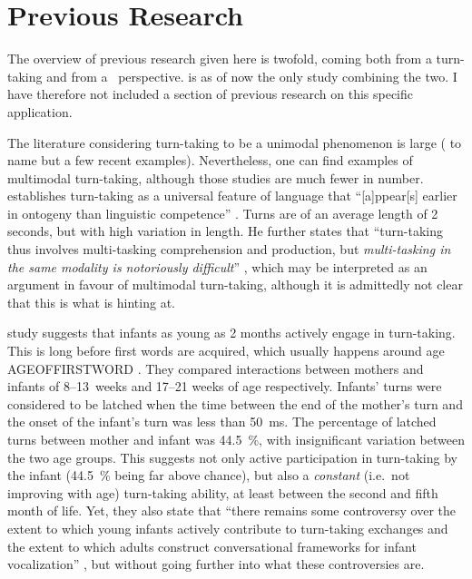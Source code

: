 \section{Previous Research}
\label{sec:introductionresearch}
The overview of previous research given here is twofold, coming both from a turn-taking and from a \fpmlower\ perspective.
\citet{rohlfing_multimodal_nodate} is as of now the only study combining the two.
I have therefore not included a section of previous research on this specific application.


The literature considering turn-taking to be a unimodal phenomenon is large (\citep{casillas_turn-taking_2016,freud_turn-taking_2016,heldner_pauses_2010} to name but a few recent examples).
Nevertheless, one can find examples of multimodal turn-taking, although those studies are much fewer in number.
\citet{levinson_turn-taking_2016} establishes turn-taking as a universal feature of language that ``[a]ppear[s] earlier in ontogeny than linguistic competence'' \citep[]{levinson_turn-taking_2016}.
Turns are of an average length of 2 seconds, but with high variation in length.
He further states that ``turn-taking thus involves multi-tasking comprehension and production, but \emph{multi-tasking in the same modality is notoriously difficult}'' \citep[, emphasis mine]{levinson_turn-taking_2016}, which may be interpreted as an argument in favour of multimodal turn-taking, although it is admittedly not clear that this is what \citeauthor{levinson_turn-taking_2016} is hinting at.%

 study suggests that infants as young as 2 months actively engage in turn-taking.
This is long before first words are acquired, which usually happens around age AGEOFFIRSTWORD \citep{nosource}.
 They compared interactions between mothers and infants of 8--13~weeks and 17--21 weeks of age respectively.
Infants' turns were considered to be latched when the time between the end of the mother's turn and the onset of the infant's turn was less than 50~ms.
The percentage of latched turns between mother and infant was 44.5~\%, with insignificant variation between the two age groups.
This suggests not only active participation in turn-taking by the infant (44.5~\% being far above chance), but also a \emph{constant} (i.e.\ not improving with age) turn-taking ability, at least between the second and fifth month of life.
Yet, they also state that ``there remains some controversy over the extent to which young infants actively contribute to turn-taking exchanges and the extent to which adults construct conversational frameworks for infant vocalization'' \citep[]{gratier_early_2015}, but without going further into what these controversies are.

